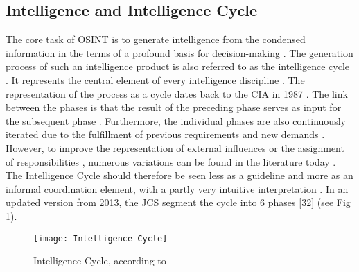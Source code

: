 \documentclass[10pt]{article}
\begin{document}
\subsection{Intelligence and Intelligence Cycle}

The core task of OSINT is to generate intelligence \cite{Hwang.2022,Dokman.2020}
from the condensed information in the terms of a profound basis for decision-making
\cite{Breakspear.2013,May.2020}. The generation process of such an intelligence product
is also referred to as the intelligence cycle \cite{HerreraCubides.2020, CentralIntelligenceAgency.1987}.
It represents the central element of every intelligence discipline \cite{Reuser.2017,Dokman.2020}.
The representation of the process as a cycle \cite{DirectorofNationalIntelligence.2011} dates
back to the CIA in 1987 \cite{CentralIntelligenceAgency.1987}. The link between the phases is that
the result of the preceding phase serves as input for the subsequent phase
\cite{JointChiefsofStaffU.S.Army.2013,Pellissier.2013}. Furthermore, the individual phases are also continuously
iterated due to the fulfillment of previous requirements and new demands \cite{Gibson.2016}.
However, to improve the representation of external influences or the
assignment of responsibilities \cite{Lowenthal.2020,Phythian.2013,Johnston.2005}, numerous
variations can be found in the literature today \cite{Bohm.2021,Reuser.2017}. The
Intelligence Cycle should therefore be seen less as a guideline and more as an informal
coordination element, with a partly very intuitive \cite{Breakspear.2013} interpretation
\cite{Hwang.2022}. In an updated version from 2013, the JCS segment the cycle into 6 phases [32] (see Fig \ref{fig: intelligence cycle}).

\begin{figure}[h]
    \centering
    \texttt{[image: Intelligence Cycle]}
    \caption{Intelligence Cycle, according to \cite{JointChiefsofStaffU.S.Army.2013}}
    \label{fig: intelligence cycle}
\end{figure}
\end{document}
